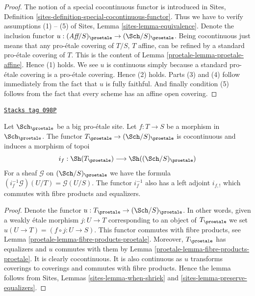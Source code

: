 \begin{proof}

The notion of a special cocontinuous functor is introduced in
Sites, Definition \ref{sites-definition-special-cocontinuous-functor}.
Thus we have to verify assumptions (1) -- (5) of
Sites, Lemma \ref{sites-lemma-equivalence}.
Denote the inclusion functor
$u : (\textit{Aff}/S)_\proetale \to (\Sch/S)_\proetale$.
Being cocontinuous just means that any pro-\'etale covering of
$T/S$, $T$ affine, can be refined by a standard pro-\'etale
covering of $T$. This is the content of
Lemma \ref{proetale-lemma-proetale-affine}.
Hence (1) holds. We see $u$ is continuous simply because a standard
pro-\'etale covering is a pro-\'etale covering. Hence (2) holds.
Parts (3) and (4) follow immediately from the fact that $u$ is
fully faithful. And finally condition (5) follows from the
fact that every scheme has an affine open covering.
\end{proof}

\begin{lemma}[Put in T]
\label{proetale-lemma-put-in-T}
\href{https://stacks.math.columbia.edu/tag/098P}{\texttt{Stacks tag 098P}}

Let $\Sch_\proetale$ be a big pro-\'etale site.
Let $f : T \to S$ be a morphism in $\Sch_\proetale$.
The functor $T_\proetale \to (\Sch/S)_\proetale$
is cocontinuous and induces a morphism of topoi
$$
i_f :
\Sh(T_\proetale)
\longrightarrow
\Sh((\Sch/S)_\proetale)
$$
For a sheaf $\mathcal{G}$ on $(\Sch/S)_\proetale$
we have the formula $(i_f^{-1}\mathcal{G})(U/T) = \mathcal{G}(U/S)$.
The functor $i_f^{-1}$ also has a left adjoint $i_{f, !}$ which commutes
with fibre products and equalizers.
\end{lemma}

\begin{proof}

Denote the functor $u : T_\proetale \to (\Sch/S)_\proetale$.
In other words, given a weakly \'etale morphism $j : U \to T$ corresponding
to an object of $T_\proetale$ we set $u(U \to T) = (f \circ j : U \to S)$.
This functor commutes with fibre products, see
Lemma \ref{proetale-lemma-fibre-products-proetale}.
Moreover, $T_\proetale$ has equalizers and $u$ commutes with them
by Lemma \ref{proetale-lemma-fibre-products-proetale}.
It is clearly cocontinuous.
It is also continuous as $u$ transforms coverings to coverings and
commutes with fibre products. Hence the lemma follows from
Sites, Lemmas \ref{sites-lemma-when-shriek}
and \ref{sites-lemma-preserve-equalizers}.
\end{proof}

